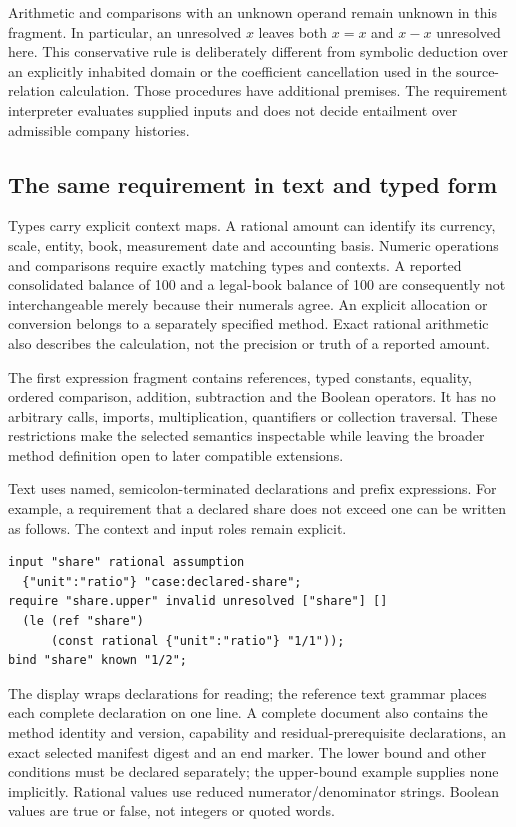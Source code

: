 Arithmetic and comparisons with an unknown operand remain unknown in this
fragment. In particular, an unresolved $x$ leaves both $x=x$ and $x-x$ unresolved
here. This conservative rule is deliberately different from symbolic deduction
over an explicitly inhabited domain or the coefficient cancellation used in the
source-relation calculation. Those procedures have additional premises. The
requirement interpreter evaluates supplied inputs and does not decide entailment
over admissible company histories.

\subsection{The same requirement in text and typed form}

Types carry explicit context maps. A rational amount can identify its currency,
scale, entity, book, measurement date and accounting basis. Numeric operations
and comparisons require exactly matching types and contexts. A reported
consolidated balance of 100 and a legal-book balance of 100 are consequently not
interchangeable merely because their numerals agree. An explicit allocation or
conversion belongs to a separately specified method. Exact rational arithmetic
also describes the calculation, not the precision or truth of a reported amount.

The first expression fragment contains references, typed constants, equality,
ordered comparison, addition, subtraction and the Boolean operators. It has no
arbitrary calls, imports, multiplication, quantifiers or collection traversal.
These restrictions make the selected semantics inspectable while leaving the
broader method definition open to later compatible extensions.

Text uses named, semicolon-terminated declarations and prefix expressions. For
example, a requirement that a declared share does not exceed one can be written
as follows. The context and input roles remain explicit.
\begin{lstlisting}
input "share" rational assumption
  {"unit":"ratio"} "case:declared-share";
require "share.upper" invalid unresolved ["share"] []
  (le (ref "share")
      (const rational {"unit":"ratio"} "1/1"));
bind "share" known "1/2";
\end{lstlisting}
The display wraps declarations for reading; the reference text grammar places
each complete declaration on one line. A complete document also contains the
method identity and version, capability and residual-prerequisite declarations,
an exact selected manifest digest and an end marker. The lower bound and other
conditions must be declared separately; the upper-bound example supplies none
implicitly. Rational values use reduced numerator/denominator strings. Boolean
values are true or false, not integers or quoted words.

